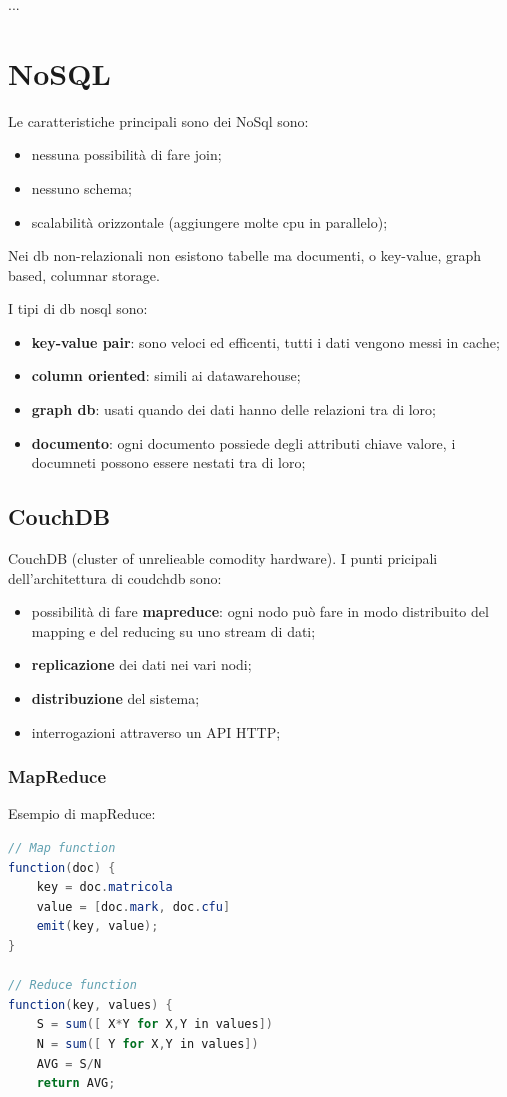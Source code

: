 \documentclass[12pt]{article}
\begin{document}
...



\section{NoSQL}
Le caratteristiche principali sono dei NoSql sono:
\begin{itemize}
    \item nessuna possibilit\`a di fare join;
    \item nessuno schema;
    \item scalabilit\`a orizzontale (aggiungere molte cpu in parallelo);
\end{itemize}
Nei db non-relazionali non esistono tabelle ma documenti, o key-value, graph based, columnar storage.

I tipi di db nosql sono:
\begin{itemize}
    \item \textbf{key-value pair}: sono veloci ed efficenti, tutti i dati vengono messi in cache;
    \item \textbf{column oriented}: simili ai datawarehouse;
    \item \textbf{graph db}: usati quando dei dati hanno delle relazioni tra di loro;
    \item \textbf{documento}: ogni documento possiede degli attributi chiave valore, i documneti possono essere nestati tra di loro;
\end{itemize}

\subsection{CouchDB}
CouchDB (cluster of unrelieable comodity hardware). I punti pricipali dell'architettura di coudchdb sono:
\begin{itemize}
    \item possibilit\`a di fare \textbf{mapreduce}: ogni nodo pu\`o fare in modo distribuito del mapping e del reducing su uno stream di dati;
    \item \textbf{replicazione} dei dati nei vari nodi;
    \item \textbf{distribuzione} del sistema;
    \item interrogazioni attraverso un API HTTP;
\end{itemize}

\subsubsection{MapReduce}
Esempio di mapReduce:
\begin{lstlisting}[language=java]
// Map function
function(doc) {
    key = doc.matricola
    value = [doc.mark, doc.cfu]
    emit(key, value);
}

// Reduce function
function(key, values) {
    S = sum([ X*Y for X,Y in values])
    N = sum([ Y for X,Y in values])
    AVG = S/N
    return AVG;
\end{lstlisting}
\end{document}
